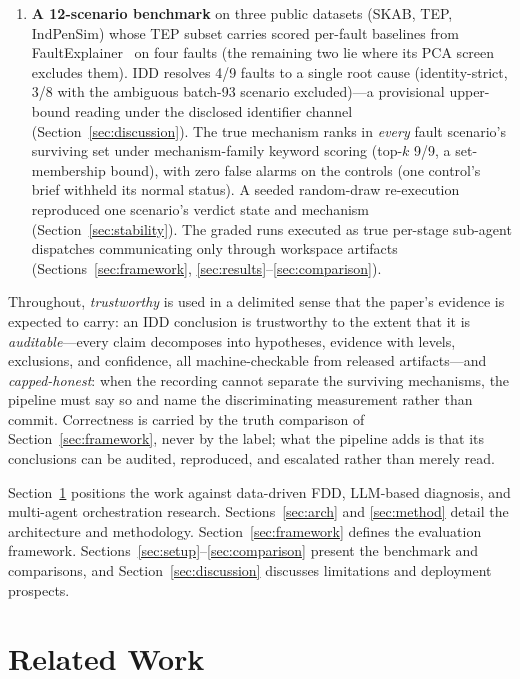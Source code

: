 \documentclass[preprint,12pt]{elsarticle}
\begin{document}
\begin{enumerate}
\item \textbf{A 12-scenario benchmark} on three public datasets (SKAB, TEP, IndPenSim) whose TEP subset carries scored per-fault baselines from FaultExplainer~\cite{khan2024faultexplainer} on four faults (the remaining two lie where its PCA screen excludes them). IDD resolves 4/9 faults to a single root cause (identity-strict, 3/8 with the ambiguous batch-93 scenario excluded)---a provisional upper-bound reading under the disclosed identifier channel (Section~\ref{sec:discussion}). The true mechanism ranks in \emph{every} fault scenario's surviving set under mechanism-family keyword scoring (top-$k$ 9/9, a set-membership bound), with zero false alarms on the controls (one control's brief withheld its normal status). A seeded random-draw re-execution reproduced one scenario's verdict state and mechanism (Section~\ref{sec:stability}). The graded runs executed as true per-stage sub-agent dispatches communicating only through workspace artifacts (Sections~\ref{sec:framework}, \ref{sec:results}--\ref{sec:comparison}).
\end{enumerate}

Throughout, \emph{trustworthy} is used in a delimited sense that the paper's evidence is expected to carry: an IDD conclusion is trustworthy to the extent that it is \emph{auditable}---every claim decomposes into hypotheses, evidence with levels, exclusions, and confidence, all machine-checkable from released artifacts---and \emph{capped-honest}: when the recording cannot separate the surviving mechanisms, the pipeline must say so and name the discriminating measurement rather than commit. Correctness is carried by the truth comparison of Section~\ref{sec:framework}, never by the label; what the pipeline adds is that its conclusions can be audited, reproduced, and escalated rather than merely read.

Section~\ref{sec:related} positions the work against data-driven FDD, LLM-based diagnosis, and multi-agent orchestration research. Sections~\ref{sec:arch} and \ref{sec:method} detail the architecture and methodology. Section~\ref{sec:framework} defines the evaluation framework. Sections~\ref{sec:setup}--\ref{sec:comparison} present the benchmark and comparisons, and Section~\ref{sec:discussion} discusses limitations and deployment prospects.

\section{Related Work}
\label{sec:related}
\end{document}
